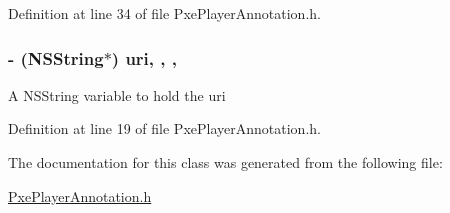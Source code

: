 Definition at line 34 of file Pxe\-Player\-Annotation.\-h.

\hypertarget{interface_pxe_player_annotation_ad4de16b477c5185f1e2cc7e3dc381478}{
\subsubsection[{uri}]{\setlength{\rightskip}{0pt plus 5cm}-\/ (N\-S\-String$\ast$) uri\hspace{0.3cm}{\ttfamily [read]}, {\ttfamily [write]}, {\ttfamily [nonatomic]}, {\ttfamily [strong]}}}\label{interface_pxe_player_annotation_ad4de16b477c5185f1e2cc7e3dc381478}
A N\-S\-String variable to hold the uri 

Definition at line 19 of file Pxe\-Player\-Annotation.\-h.



The documentation for this class was generated from the following file\-:\begin{DoxyCompactItemize}
\item 
\hyperlink{_pxe_player_annotation_8h}{Pxe\-Player\-Annotation.\-h}\end{DoxyCompactItemize}
